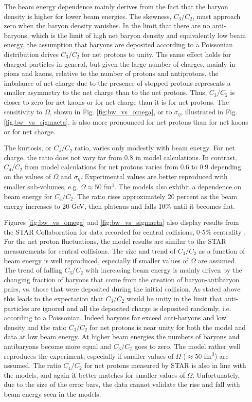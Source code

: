 The beam energy dependence mainly derives from the fact that the baryon density is higher for lower beam energies. The skewness, $C_3/C_2$, must approach zero when the baryon density vanishes. In the limit that there are no anti-baryons, which is the limit of high net baryon density and equivalently low beam energy, the assumption that baryons are deposited according to a Poissonian distribution drives $C_3/C_2$ for net protons to unity. The same effect holds for charged particles in general, but given the large number of charges, mainly in pions and kaons, relative to the number of protons and antiprotons, the imbalance of net charge due to the presence of stopped protons represents a smaller asymmetry to the net charge than to the net protons. Thus, $C_3/C_2$ is closer to zero for net kaons or for net charge than it is for net protons. The sensitivity to $\Omega$, shown in Fig. \ref{fig:bw_vs_omega}, or to $\sigma_\eta$, illustrated in Fig. \ref{fig:bw_vs_sigmaeta}, is also more pronounced for net protons than for net kaons or for net charge.

The kurtosis, or $C_4/C_2$ ratio, varies only modestly with beam energy. For net charge, the ratio does not vary far from 0.8 in model calculations. In contrast, $C_4/C_2$ from model calculations for net protons varies from 0.6 to 0.9 depending on the values of $\Omega$ and $\sigma_\eta$. Experimental values are better reproduced with smaller sub-volumes, e.g. $\Omega\approx 50$ fm$^3$. The models also exhibit a dependence on beam energy for $C_4/C_2$. The ratio rises approximately 20 percent as the beam energy increases to 20 GeV, then plateaus and falls 10\% until it becomes flat.

Figures \ref{fig:bw_vs_omega} and \ref{fig:bw_vs_sigmaeta} also display results from the STAR Collaboration for data recorded for central collisions, 0-5\% centrality \cite{Adamczyk:2014fia,Adam:2020unf,Adamczyk:2017wsl}. For the net proton fluctuations, the model results are similar to the STAR measurements for central collisions. The size and trend of $C_3/C_2$ as a function of beam energy is well reproduced, especially if smaller values of $\Omega$ are assumed. The trend of falling $C_3/C_2$ with increasing beam energy is mainly driven by the changing fraction of baryons that come from the creation of baryon-antibaryon pairs, vs. those that were deposited during the initial collision. As stated above this leads to the expectation that $C_3/C_2$ would be unity in the limit that anti-particles are ignored and all the deposited charge is deposited randomly, i.e. according to a Poissonian. Indeed baryons far exceed anti-baryons and low density and the ratio $C_3/C_2$ for net protons is near unity for both the model and data at low beam energy. At higher beam energies the numbers of baryons and antibaryons become more equal and $C_3/C_2$ goes to zero. The model rather well reproduces the experiment, especially if smaller values of $\Omega$ ($\approx 50$ fm$^3$) are assumed. The ratio $C_4/C_2$ for net protons measured by STAR is also in line with the models, and again it better matches for smaller values of $\Omega$. Unfortunately, due to the size of the error bars, the data cannot validate the rise and fall with beam energy seen in the models. 

